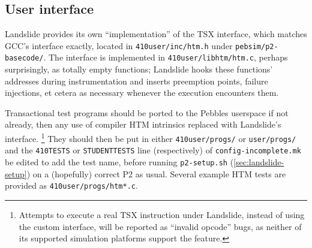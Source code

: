 \subsection{User interface}
\label{sec:tm-interface}

Landslide provides its own ``implementation'' of the TSX interface,
which matches GCC's interface exactly,
located in {\tt 410user/inc/htm.h}
under {\tt pebsim/p2-basecode/}.
The interface is implemented in {\tt 410user/libhtm/htm.c},
perhaps surprisingly, as totally empty functions;
Landslide hooks these functions' addresses during instrumentation
and inserts preemption points, failure injections,
et cetera as necessary whenever the execution encounters them.

Transactional test programs should be ported to the Pebbles userspace if not already,
then any use of compiler HTM intrinsics replaced with Landslide's interface.%
\footnote{Attempts to execute a real TSX instruction under Landslide, instead of using the custom interface,
will be reported as ``invalid opcode'' bugs,
as neither of its supported simulation platforms support the feature.
}
They should then be put in either {\tt 410user/progs/} or {\tt user/progs/}
and the {\tt 410TESTS} or {\tt STUDENTTESTS} line (respectively) of {\tt config-incomplete.mk} be edited to add the test name,
before running {\tt p2-setup.sh} (\cref{sec:landslide-setup})
on a (hopefully) correct P2 as usual.
Several example HTM tests are provided as {\tt 410user/progs/htm*.c}.

